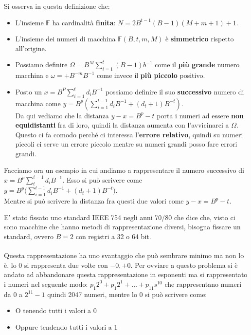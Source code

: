 \noindent Si osserva in questa definizione che:
\begin{itemize}
    \item L'insieme \(\mathbb{F}\) ha cardinalità \textbf{finita}: \(N = 2B^{t-1}(B-1)(M + m + 1) + 1\).
    \item L'insieme dei numeri di macchina \(\mathbb{F}(B, t, m, M)\) è \textbf{simmetrico} rispetto all'origine.
    \item Possiamo definire \(\Omega = B^M \sum_{i=1}^{t} (B-1)b^{-1}\) come il \textbf{più grande} numero macchina e \(\omega = +B^{-m} B^{-1}\) come
    invece il \textbf{più piccolo} positivo.
    \item Posto un \(x = B^P \sum_{i=1}^{t}d_i B^{-1}\) possiamo definire il suo \textbf{successivo} numero di macchina come \(y = B^p(\sum_{i=1}^{t-1}d_i B^{-1} + (d_t + 1)B^{-t})\). \\
    Da qui vediamo che la distanza \(y - x = B^p - t\) porta
    i numeri ad essere \textbf{non equidistanti} fra di loro, quindi la distanza aumenta con l'avvicinarci a \(\Omega\).\\
    Questo ci fa comodo perché ci interessa l'\textbf{errore relativo}, quindi su numeri piccoli ci serve un errore piccolo mentre su numeri grandi posso fare errori grandi.
\end{itemize}

\begin{example}
    Facciamo ora un esempio in cui andiamo a rappresentare il numero successivo di \(x = B^p \sum_{t}^{i=1} d_i B^{-1}\). Esso
    si può scrivere come \(y = B^p \bigg( \sum_{i=1}^{t-1} d_i B^{-1} + (d_t + 1)B^{-t} \bigg)\).\\
    Mentre si può scrivere la distanza fra questi due valori come \(y - x = B^p - t\).
\end{example}

\noindent E' stato fissato uno standard IEEE 754 negli anni 70/80 che dice che, visto ci sono macchine che hanno metodi di rappresentazione
diversi, bisogna fissare un standard, ovvero \(B = 2\) con registri a 32 o 64 bit.\\\\
Questa rappresentazione ha uno svantaggio che può sembrare minimo ma non lo è, lo 0 si rappresenta due volte con \(-0, +0\). Per ovviare
a questo problema si è andato ad abbandonare questa rappresentazione in esponenti ma si rappresentato i numeri nel seguente modo:
\(p_1 2^0 + p_1 2^1 + \dots + p_11 s^10 \) che rappresentano numeri da 0 a \(2^11 - 1\) quindi 2047 numeri, mentre lo 0 si può scrivere come:
\begin{itemize}
    \item O tenendo tutti i valori a 0
    \item Oppure tendendo tutti i valori a 1
\end{itemize}

